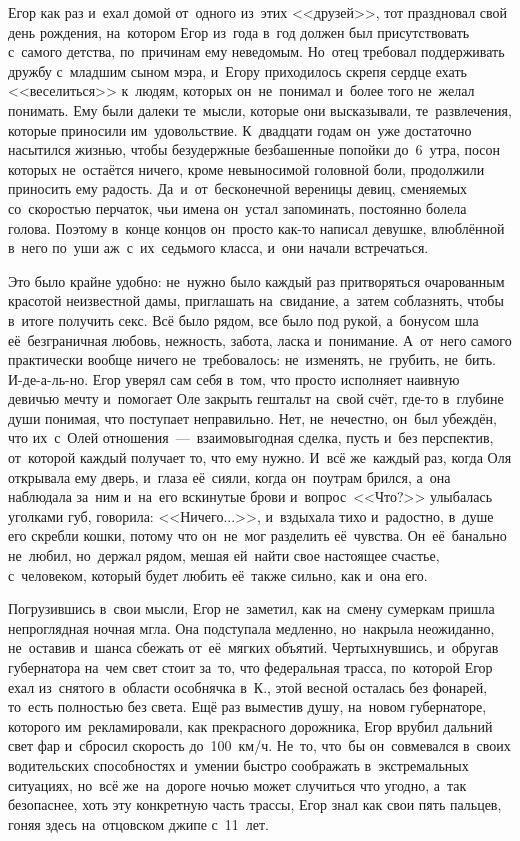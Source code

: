 Егор как раз и~ехал домой от~одного из~этих <<друзей>>, тот праздновал свой день рождения, на~котором Егор из~года в~год должен был присутствовать с~самого детства, по~причинам ему неведомым.
Но~отец требовал поддерживать дружбу с~младшим сыном мэра, и~Егору приходилось скрепя сердце ехать <<веселиться>> к~людям, которых он~не~понимал и~более того не~желал понимать.
Ему были далеки те~мысли, которые они высказывали, те~развлечения, которые приносили им~удовольствие.
К~двадцати годам он~уже достаточно насытился жизнью, чтобы безудержные безбашенные попойки до~6~утра, посон которых не~остаётся ничего, кроме невыносимой головной боли, продолжили приносить ему радость.
Да~и~от~бесконечной вереницы девиц, сменяемых со~скоростью перчаток, чьи имена он~устал запоминать, постоянно болела голова.
Поэтому в~конце концов он~просто как-то написал девушке, влюблённой в~него по~уши аж~с~их~седьмого класса, и~они начали встречаться.
 

Это было крайне удобно: не~нужно было каждый раз притворяться очарованным красотой неизвестной дамы, приглашать на~свидание, а~затем соблазнять, чтобы в~итоге получить секс.
Всё было рядом, все было под рукой, а~бонусом шла её~безграничная любовь, нежность, забота, ласка и~понимание.
А~от~него самого практически вообще ничего не~требовалось: не~изменять, не~грубить, не~бить.
И-де-а-ль-но.
Егор уверял сам себя в~том, что просто исполняет наивную девичью мечту и~помогает Оле закрыть гештальт на~свой счёт, где-то в~глубине души понимая, что поступает неправильно.
Нет, не~нечестно, он~был убеждён, что их~с~Олей отношения~---~взаимовыгодная сделка, пусть и~без перспектив, от~которой каждый получает то, что ему нужно.
И~всё же~каждый раз, когда Оля открывала ему дверь, и~глаза её~сияли, когда он~поутрам брился, а~она наблюдала за~ним и~на~его вскинутые брови и~вопрос~<<Что?>> улыбалась уголками губ, говорила: <<Ничего...>>, и~вздыхала тихо и~радостно, в~душе его скребли кошки, потому что он~не~мог разделить её~чувства.
Он~её~банально не~любил, но~держал рядом, мешая ей~найти свое настоящее счастье, с~человеком, который будет любить её~также сильно, как и~она его.
 

Погрузившись в~свои мысли, Егор не~заметил, как на~смену сумеркам пришла непроглядная ночная мгла.
Она подступала медленно, но~накрыла неожиданно, не~оставив и~шанса сбежать от~её~мягких объятий.
Чертыхнувшись, и~обругав губернатора на~чем свет стоит за~то, что федеральная трасса, по~которой Егор ехал из~снятого в~области особнячка в~К., этой весной осталась без фонарей, то~есть полностью без света.
Ещё раз выместив душу, на~новом губернаторе, которого им~рекламировали, как прекрасного дорожника, Егор врубил дальний свет фар и~сбросил скорость до~100~км/ч.
Не~то, что~бы он~совмевался в~своих водительских способностях и~умении быстро соображать в~экстремальных ситуациях, но~всё же~на~дороге ночью может случиться что угодно, а~так безопаснее, хоть эту конкретную часть трассы, Егор знал как свои пять пальцев, гоняя здесь на~отцовском джипе с~11~лет.
 

